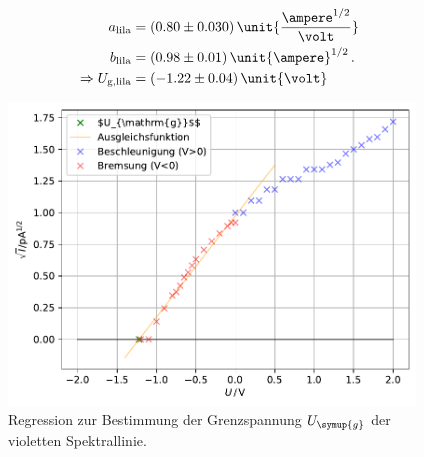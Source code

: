 \begin{align*}
    a_{\text{lila}}&=(0.80\pm 0.030) \, \unit{\frac{\ampere ^{1/2}}{\volt}}\\
    b_{\text{lila}}&=(0.98\pm 0.01) \, \unit{\ampere}^{1/2}\, .\\
    \Rightarrow U_{\text{g,lila}}&=(-1.22\pm 0.04)\, \unit{\volt}\\
\end{align*}

\begin{figure}
    \centering
    \includegraphics[height = 8cm]{build/plotlila.pdf}
    \caption{Regression zur Bestimmung der Grenzspannung $U_{\symup{g}}$ der violetten Spektrallinie.}
    \label{fig:lila}
\end{figure}




